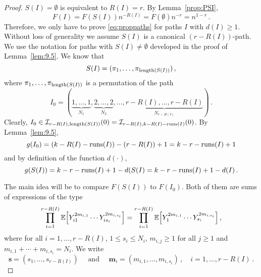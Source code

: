 \begin{proof}
$S(I)=\emptyset$ is equivalent to $R(I)=r$. By Lemma~\ref{prop:PSI}, 
\begin{equation*}
F(I)=F(S(I)) n^{-R(I)} =F(\emptyset)n^{-r}=n^{1-r}\,.
\end{equation*}
Therefore, we only have to prove \eqref{eq:proppaths} for paths $I$ with $d(I)\ge 1$. Without loss of generality we assume $S(I)$ is a canonical $(r-R(I))$-path. We use the notation for paths with $S(I)\neq \emptyset$ developed in the proof of Lemma~\ref{lem:9.5}. We know that
\begin{equation*}
S(I)= (\pi_1, \ldots, \pi_{\operatorname{length}(S(I))})\,,
\end{equation*}
where $\pi_1, \ldots, \pi_{\operatorname{length}(S(I))}$ is a permutation of the path
\begin{equation*}
I_0 = (\underbrace{1,\ldots,1}_{N_1},\underbrace{2,\ldots,2}_{N_2}, \ldots, \underbrace{r-R(I),\ldots,r-R(I)}_{N_{r-R(I)}})\,.
\end{equation*}
Clearly, $I_0 \in \mathcal{I}_{r-R(I),\operatorname{length}(S(I))}(0)= \mathcal{I}_{r-R(I),k-R(I)-\operatorname{runs}(I)}(0)$. By Lemma~\ref{lem:9.5}, 
\begin{equation*}
g(I_0)=(k-R(I)-\operatorname{runs}(I))-(r-R(I))+1 = k-r-\operatorname{runs}(I)+1
\end{equation*}
and by definition of the function $d(\cdot)$,
\begin{equation*}
g(S(I))=k-r-\operatorname{runs}(I)+1 -d(S(I)=k-r-\operatorname{runs}(I)+1-d(I)\,.
\end{equation*}
\par
The main idea will be to compare $F(S(I))$ to $F(I_0)$. Both of them are sums of expressions of the type
\begin{equation}\label{eq:type}
\prod_{i=1}^{r-R(I)} \mathbb{E}\Big[Y_{i1}^{2m_{i,1}}\cdots Y_{is_i}^{2m_{i,s_i}} \Big] = \prod_{i=1}^{r-R(I)} 
\mathbb{E}\Big[Y_{1}^{2m_{i,1}}\cdots Y_{s_i}^{2m_{i,s_i}} \Big]\,, 
\end{equation}
where for all $i=1,\ldots,r-R(I)$, $1\le s_i\le N_i$, $m_{i,j}\ge 1$ for all $j\ge 1$ and $m_{i,1}+\cdots +m_{i,s_i}=N_i$. We write 
\begin{equation}\label{eq:sdfesofj}
\mathbf{s}=(s_1,\ldots,s_{r-R(I)}) \quad \text{ and } \quad \mathbf{m}_i=(m_{i,1},\ldots,m_{i,s_i})\,,\quad i=1,\ldots,r-R(I)\,.

\end{equation}
\end{proof}

